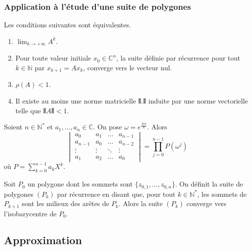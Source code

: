 	\subsubsection{Application à l'étude d'une suite de polygones}
	
	\begin{proposition}
		Les conditions suivantes sont équivalentes.
		\begin{enumerate}[label=(\roman*)]
			\item $\lim_{k \rightarrow +\infty} A^k$.
			\item Pour toute valeur initiale $x_0 \in \mathbb{C}^n$, la suite définie par récurrence pour tout $k \in \mathbb{N}$ par $x_{k+1} = A x_k$, converge vers le vecteur nul.
			\item $\rho(A) < 1$.
			\item Il existe au moins une norme matricielle $\VERT . \VERT$ induite par une norme vectorielle telle que $\VERT A \VERT < 1$.
		\end{enumerate}
	\end{proposition}
	
	
	\begin{lemma}
		\label{suite-de-polygones-1}
		Soient $n \in \mathbb{N}^*$ et $a_1, \dots, a_n \in \mathbb{C}$. On pose $\omega = e^{\frac{2i\pi}{n}}$. Alors
		\[ \begin{vmatrix} a_0 & a_1 & \dots & a_{n-1} \\ a_{n-1} & a_0 & \dots & a_{n-2}\\ \vdots & \vdots & \ddots & \vdots \\ a_1 & a_2 & \dots & a_0 \end{vmatrix} = \prod_{j=0}^{n-1} P(\omega^j) \]
		où $P = \sum_{k=0}^{n-1} a_k X^k$.
	\end{lemma}
	
	
	\begin{application}
		Soit $P_0$ un polygone dont les sommets sont $\{ z_{0,1}, \dots, z_{0,n} \}$. On définit la suite de polygones $(P_k)$ par récurrence en disant que, pour tout $k \in \mathbb{N}^*$, les sommets de $P_{k+1}$ sont les milieux des arêtes de $P_k$.
		\newpar
		Alors la suite $(P_k)$ converge vers l'isobarycentre de $P_0$.
	\end{application}
	
	\subsection{Approximation}
	
